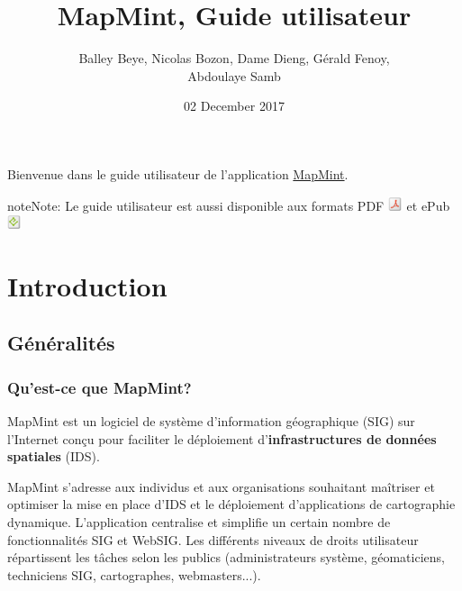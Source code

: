 \documentclass[letterpaper,10pt,french]{sphinxmanual}
\title{MapMint, Guide utilisateur}
\date{02 December 2017}
\author{Balley Beye, Nicolas Bozon, Dame Dieng, Gérald Fenoy, \\Abdoulaye Samb}
\begin{document}
\maketitle
\tableofcontents
{}\label{index::doc}


Bienvenue dans le guide utilisateur de l'application \href{http://mapmint.com}{MapMint}.

\begin{notice}{note}{Note:}
Le guide utilisateur est aussi disponible aux formats
PDF \includegraphics{pdf.png}  et ePub \includegraphics{epub.png}
\end{notice}


\chapter{Introduction}
\label{introduction/index:table-des-matieres}\label{introduction/index:home}\label{introduction/index::doc}\label{introduction/index:dashboard}\label{introduction/index:introduction}

\section{Généralités}
\label{introduction/introduction:generalites}\label{introduction/introduction::doc}\label{introduction/introduction:userguidegeneral}

\subsection{Qu’est-ce que MapMint?}
\label{introduction/introduction:quest-ce-que-mapmint}
MapMint est un logiciel de système d'information géographique (SIG) sur l'Internet  conçu pour faciliter le déploiement d'\textbf{infrastructures de données spatiales} (IDS).

MapMint s'adresse aux individus et aux organisations souhaitant maîtriser et optimiser la mise en place d'IDS et le déploiement d'applications de cartographie dynamique. L'application centralise et simplifie un certain nombre de fonctionnalités SIG et WebSIG. Les différents niveaux de droits utilisateur répartissent les tâches selon les publics (administrateurs système, géomaticiens, techniciens SIG, cartographes, webmasters...).
\end{document}
